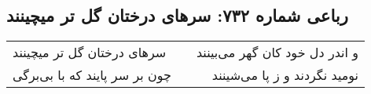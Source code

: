 \begin{center}
\section*{رباعی شماره ۷۳۲: سرهای درختان گل تر میچینند}
\label{sec:0732}
\begin{longtable}{l p{0.5cm} r}
سرهای درختان گل تر میچینند
&&
و اندر دل خود کان گهر می‌بینند
\\
چون بر سر پایند که با بی‌برگی
&&
نومید نگردند و ز پا می‌شینند
\\
\end{longtable}
\end{center}
